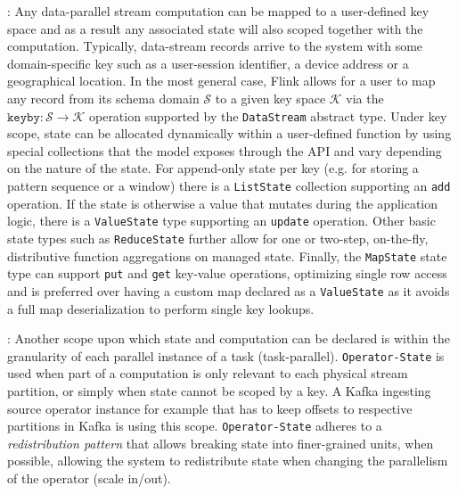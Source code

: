 : Any data-parallel stream computation can be mapped to a user-defined key space and as a result any associated state will also scoped together with the computation. Typically, data-stream records arrive to the system with some domain-specific key such as a user-session identifier, a device address or a geographical location. In the most general case, Flink allows for a user to map any record from its schema domain $\mathcal{S}$ to a given key space $\mathcal{K}$ via the $\texttt{keyby}: \mathcal{S} \rightarrow \mathcal{K}$ operation supported by the \texttt{DataStream} abstract type. Under key scope, state can be allocated dynamically within a user-defined function by using special collections that the model exposes through the API and vary depending on the nature of the state. For append-only state per key (e.g. for storing a pattern sequence or a window) there is a \texttt{ListState} collection supporting an \texttt{add} operation. If  the state is otherwise a value that mutates during the application logic, there is a \texttt{ValueState} type supporting an \texttt{update} operation. Other basic state types such as \texttt{ReduceState} further allow for one or two-step, on-the-fly, distributive function aggregations on managed state. Finally, the \texttt{MapState} state type can support \texttt{put} and \texttt{get} key-value operations, optimizing single row access and is preferred over having a custom map declared as a \texttt{ValueState} as it avoids a full map deserialization to perform single key lookups.

: Another scope upon which state and computation can be declared is within the granularity of each parallel instance of a task (task-parallel). \texttt{Operator-State} is used when part of a computation is only relevant to each physical stream partition, or simply when state cannot be scoped by a key. A Kafka ingesting source operator instance for example that has to keep offsets to respective partitions in Kafka is using this scope. \texttt{Operator-State} adheres to a \emph{redistribution pattern} that allows breaking state into finer-grained units, when possible, allowing the system to redistribute state when changing the parallelism of the operator (scale in/out).



